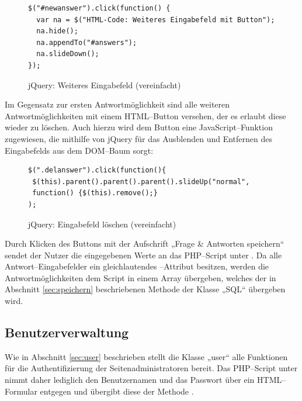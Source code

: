 \begin{figure}[H]
\begin{spacing}{1.0}
\begin{verbatim}
$("#newanswer").click(function() {
  var na = $("HTML-Code: Weiteres Eingabefeld mit Button");
  na.hide();
  na.appendTo("#answers");
  na.slideDown();	
});
\end{verbatim}
\caption{jQuery: Weiteres Eingabefeld (vereinfacht)}
\label{jquery:weitereantwort}
\end{spacing}
\end{figure}

Im Gegensatz zur ersten Antwortmöglichkeit sind alle weiteren Antwortmöglichkeiten mit einem HTML--Button versehen, der es erlaubt diese wieder zu löschen. Auch hierzu wird dem Button eine JavaScript--Funktion zugewiesen, die mithilfe von jQuery für das Ausblenden und Entfernen des Eingabefelds aus dem DOM--Baum sorgt:

\begin{figure}[H]
\begin{spacing}{1.0}
\begin{verbatim}
$(".delanswer").click(function(){
 $(this).parent().parent().parent().slideUp("normal",
 function() {$(this).remove();}
);
\end{verbatim}
\caption{jQuery: Eingabefeld löschen (vereinfacht)}
\label{jquery:antwortloeschen}
\end{spacing}
\end{figure}

Durch Klicken des Buttons mit der Aufschrift „Frage \& Antworten speichern“ sendet der Nutzer die eingegebenen Werte an das PHP--Script unter . Da alle Antwort--Eingabefelder ein gleichlautendes --Attribut besitzen, werden die Antwortmöglichkeiten dem Script in einem Array übergeben, welches der in Abschnitt \ref{sec:speichern} beschriebenen Methode der Klasse „SQL“ übergeben wird.

\subsection{Benutzerverwaltung}

Wie in Abschnitt \ref{sec:user} beschrieben stellt die Klasse „user“ alle Funktionen für die Authentifizierung der Seitenadministratoren bereit. Das PHP--Script unter  nimmt daher lediglich den Benutzernamen und das Passwort über ein HTML--Formular entgegen und übergibt diese der Methode .

